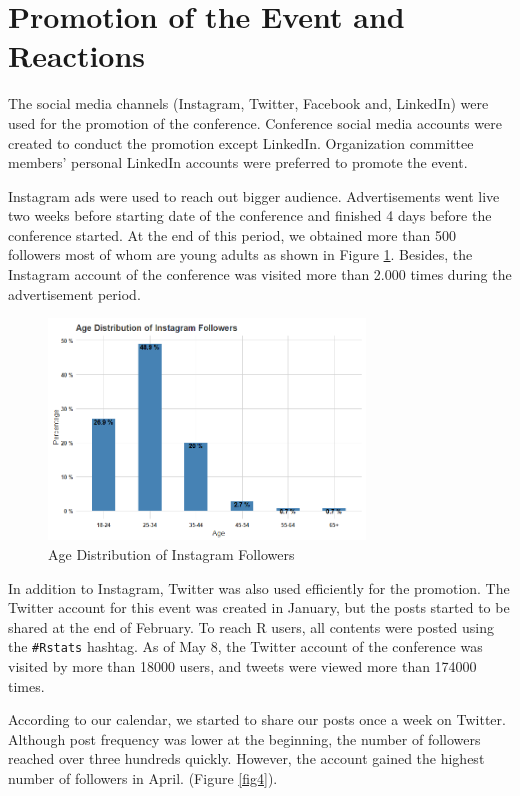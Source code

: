 \section{Promotion of the Event and Reactions}

The social media channels (Instagram, Twitter, Facebook and, LinkedIn) were used for the promotion of the conference. Conference social media accounts were created to conduct the promotion except LinkedIn. Organization committee members' personal LinkedIn accounts were preferred to promote the event.

Instagram ads were used to reach out bigger audience. Advertisements went live two weeks before starting date of the conference and finished 4 days before the conference started. At the end of this period, we obtained more than 500 followers most of whom are young adults as shown in Figure \ref{fig3}.  Besides, the Instagram account of the conference was visited more than 2.000 times during the advertisement period.

\begin{figure}[!h]
    \centering
    \includegraphics[width=0.75\textwidth]{insta_followers.png}
    \caption{Age Distribution of Instagram Followers}
    \label{fig3}
\end{figure}

In addition to Instagram, Twitter was also used efficiently for the promotion. The Twitter account for this event was created in January, but the posts started to be shared at the end of February. To reach R users, all contents were posted using the \texttt{\#Rstats} hashtag. As of May 8, the Twitter account of the conference was visited by more than 18000 users, and tweets were viewed more than 174000 times. 

According to our calendar, we started to share our posts once a week on Twitter. Although post frequency was lower at the beginning, the number of followers reached over three hundreds quickly. However, the account gained the highest number of followers in April. (Figure \ref{fig4}). 

